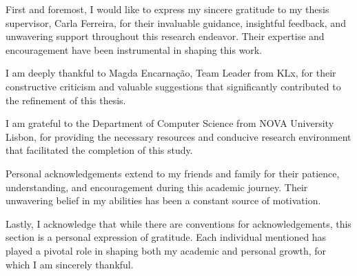 
%

\begin{ntacknowledgements}

First and foremost, I would like to express my sincere gratitude to my thesis supervisor, Carla Ferreira, for their invaluable guidance, insightful feedback, and unwavering support throughout this research endeavor. Their expertise and encouragement have been instrumental in shaping this work.

I am deeply thankful to Magda Encarnação, Team Leader from KLx, for their constructive criticism and valuable suggestions that significantly contributed to the refinement of this thesis.

I am grateful to the Department of Computer Science from NOVA University Lisbon, for providing the necessary resources and conducive research environment that facilitated the completion of this study.

Personal acknowledgements extend to my friends and family for their patience, understanding, and encouragement during this academic journey. Their unwavering belief in my abilities has been a constant source of motivation.

Lastly, I acknowledge that while there are conventions for acknowledgements, this section is a personal expression of gratitude. Each individual mentioned has played a pivotal role in shaping both my academic and personal growth, for which I am sincerely thankful.

\end{ntacknowledgements}